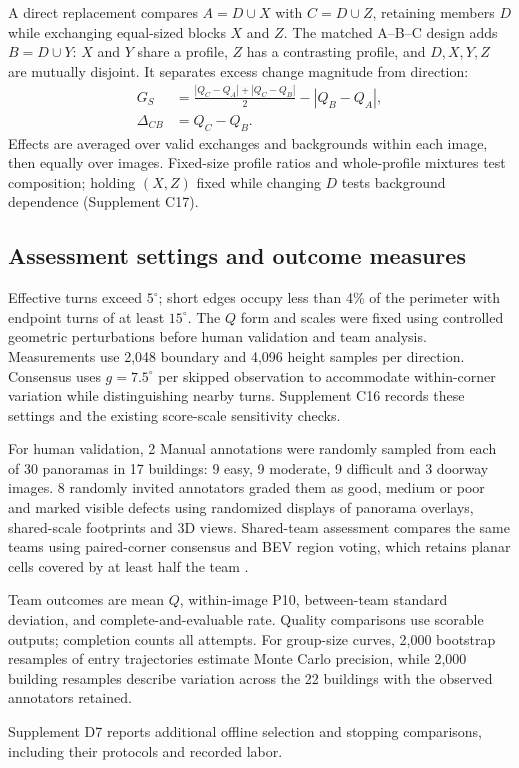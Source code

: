 A direct replacement compares $A=D\cup X$ with $C=D\cup Z$, retaining members $D$ while exchanging equal-sized blocks $X$ and $Z$. The matched A--B--C design adds $B=D\cup Y$: $X$ and $Y$ share a profile, $Z$ has a contrasting profile, and $D,X,Y,Z$ are mutually disjoint. It separates excess change magnitude from direction:
\begin{align}
G_S&=\frac{|Q_C-Q_A|+|Q_C-Q_B|}{2}-|Q_B-Q_A|,\label{eq:symmetric-excess}\\
\Delta_{CB}&=Q_C-Q_B.\label{eq:directional-change}
\end{align}
Effects are averaged over valid exchanges and backgrounds within each image, then equally over images. Fixed-size profile ratios and whole-profile mixtures test composition; holding $(X,Z)$ fixed while changing $D$ tests background dependence (Supplement C17).

\subsection{Assessment settings and outcome measures}
\label{sec:method-assessment}

Effective turns exceed $5^\circ$; short edges occupy less than 4\% of the perimeter with endpoint turns of at least $15^\circ$. The $Q$ form and scales were fixed using controlled geometric perturbations before human validation and team analysis. Measurements use 2,048 boundary and 4,096 height samples per direction. Consensus uses $g=7.5^\circ$ per skipped observation to accommodate within-corner variation while distinguishing nearby turns. Supplement C16 records these settings and the existing score-scale sensitivity checks.

For human validation, 2 Manual annotations were randomly sampled from each of 30 panoramas in 17 buildings: 9 easy, 9 moderate, 9 difficult and 3 doorway images. 8 randomly invited annotators graded them as good, medium or poor and marked visible defects using randomized displays of panorama overlays, shared-scale footprints and 3D views. Shared-team assessment compares the same teams using paired-corner consensus and BEV region voting, which retains planar cells covered by at least half the team \cite{lee2018}.

Team outcomes are mean $Q$, within-image P10, between-team standard deviation, and complete-and-evaluable rate. Quality comparisons use scorable outputs; completion counts all attempts. For group-size curves, 2,000 bootstrap resamples of entry trajectories estimate Monte Carlo precision, while 2,000 building resamples describe variation across the 22 buildings with the observed annotators retained.

Supplement D7 reports additional offline selection and stopping comparisons, including their protocols and recorded labor.
